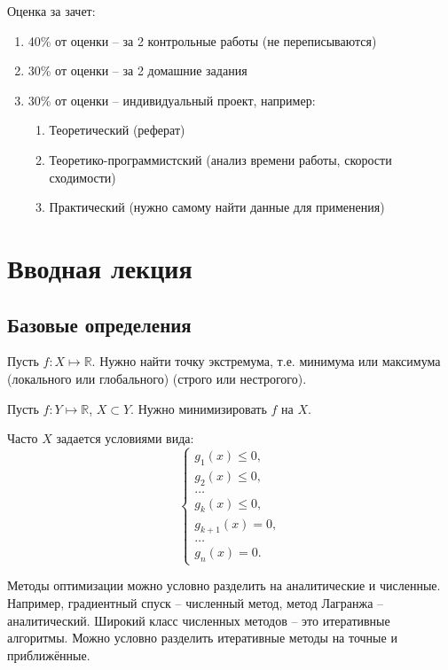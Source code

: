 \documentclass[document.tex]{subfiles}
\begin{document}
Оценка за зачет:
\begin{enumerate}
\item 40\% от оценки -- за 2 контрольные работы (не переписываются)
\item 30\% от оценки -- за 2 домашние задания
\item 30\% от оценки -- индивидуальный проект, например:
\begin{enumerate}
\item Теоретический (реферат)
\item Теоретико-программистский (анализ времени работы, скорости сходимости)
\item Практический (нужно самому найти данные для применения)
\end{enumerate}
\end{enumerate}
\section{Вводная лекция}
\subsection{Базовые определения}
\begin{definition}
Пусть $f: X \mapsto \mathbb{R}$. Нужно найти точку экстремума, т.е. минимума или максимума (локального или глобального) (строго или нестрогого).
\end{definition}
\begin{definition}
Пусть $f: Y \mapsto \mathbb{R}$, $X \subset Y$. Нужно минимизировать $f$ на $X$.
\end{definition}
\begin{remark}
Часто $X$ задается условиями вида:
$$\begin{cases}
g_1(x) \leq 0, \\
g_2(x) \leq 0, \\
\ldots \\
g_k(x) \leq 0, \\
g_{k+1}(x) = 0, \\
\ldots \\
g_n(x) = 0.
\end{cases}$$
\end{remark}
\begin{remark}
Методы оптимизации можно условно разделить на аналитические и численные. Например, градиентный спуск -- численный метод, метод Лагранжа -- аналитический. Широкий класс численных методов -- это итеративные алгоритмы. Можно условно разделить итеративные методы на точные и приближённые.
\end{remark}
\end{document}
